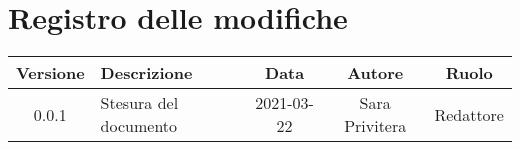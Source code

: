\section*{Registro delle modifiche}

\begin{center}
	\begin{longtable}{|c|p{5cm}|c|c|c|}
	\hline
	\rowcolor{lighter-grayer}
	\textbf{Versione} & \textbf{Descrizione} & \textbf{Data} & \textbf{Autore} & \textbf{Ruolo} \\
	\hline
	\endfirsthead

	
	0.0.1 & Stesura del documento & 2021-03-22 & Sara Privitera & Redattore \\
	\hline
	\end{longtable}
\end{center}

